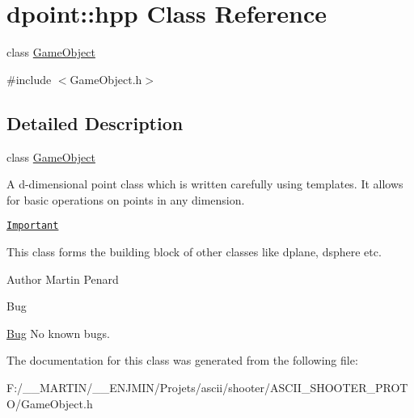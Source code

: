 \hypertarget{classdpoint_1_1hpp}{}\section{dpoint\+:\+:hpp Class Reference}
\label{classdpoint_1_1hpp}


class \hyperlink{class_game_object}{Game\+Object}  




{\ttfamily \#include $<$Game\+Object.\+h$>$}



\subsection{Detailed Description}
class \hyperlink{class_game_object}{Game\+Object} 

A d-\/dimensional point class which is written carefully using templates. It allows for basic operations on points in any dimension.

\href{http://perdu.com}{\tt Important}

This class forms the building block of other classes like dplane, dsphere etc.

\begin{DoxyAuthor}{Author}
Martin Penard 
\end{DoxyAuthor}
\begin{DoxyRefDesc}{Bug}
\item[\hyperlink{bug__bug000001}{Bug}]No known bugs. \end{DoxyRefDesc}


The documentation for this class was generated from the following file\+:\begin{DoxyCompactItemize}
\item 
F\+:/\+\_\+\+\_\+\+M\+A\+R\+T\+I\+N/\+\_\+\+\_\+\+E\+N\+J\+M\+I\+N/\+Projets/ascii/shooter/\+A\+S\+C\+I\+I\+\_\+\+S\+H\+O\+O\+T\+E\+R\+\_\+\+P\+R\+O\+T\+O/Game\+Object.\+h\end{DoxyCompactItemize}
